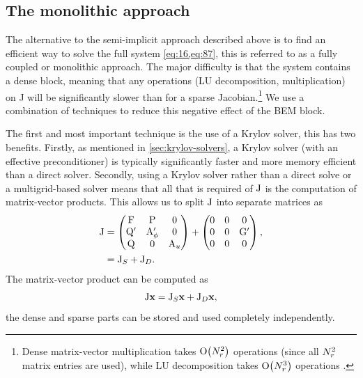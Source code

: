 \subsection{The monolithic approach}
\label{sec:fully-implicit-bem}

The alternative to the semi-implicit approach described above is to find an efficient way to solve the full system \cref{eq:16,eq:87}, this is referred to as a fully coupled or monolithic approach.
The major difficulty is that the system contains a dense block, meaning that any operations (\eg LU decomposition, multiplication) on J will be significantly slower than for a sparse Jacobian.\footnote{Dense matrix-vector multiplication takes $\mathrm{O}{\left( N_r^2 \right)}$ operations (since all $N_r^2$ matrix entries are used), while LU decomposition takes $\mathrm{O}{\left( N_r^3 \right)}$ operations \cite[223]{Iserles2009}.}
We use a combination of techniques to reduce this negative effect of the BEM block.

The first and most important technique is the use of a Krylov solver, this has two benefits.
Firstly, as mentioned in \cref{sec:krylov-solvers}, a Krylov solver (with an effective preconditioner) is typically significantly faster and more memory efficient than a direct solver.
Secondly, using a Krylov solver rather than a direct solve or a multigrid-based solver means that all that is required of $\mathrm{J}$ is the computation of matrix-vector products.
This allows us to split $\mathrm{J}$ into separate matrices as
\begin{equation}
  \begin{aligned}
    \mathrm{J} &=
    \begin{pmatrix}
      \mathrm{F}       & \mathrm{P}     &  0 \\
      \mathrm{Q}' &   \mathrm{A}_\phi' &  0  \\
      \mathrm{Q}       &  0       &   \mathrm{A}_u
    \end{pmatrix}
    +
    \begin{pmatrix}
      0       & 0     &  0 \\
      0       &  0    &  \mathrm{G}'  \\
      0       &  0    &  0
    \end{pmatrix},
    \\
    &= \mathrm{J}_S + \mathrm{J}_D.
  \end{aligned}
\end{equation}
The matrix-vector product can be computed as
\begin{equation}
  \mathrm{J} \boldsymbol{\mathrm{x}} = \mathrm{J}_S \boldsymbol{\mathrm{x}} + \mathrm{J}_D \boldsymbol{\mathrm{x}},
\end{equation}
\ie the dense and sparse parts can be stored and used completely independently.

